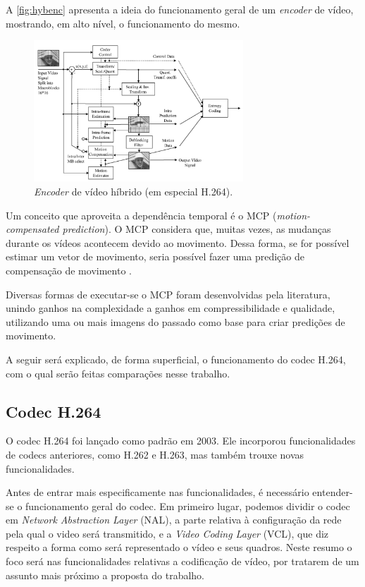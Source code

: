 \documentclass[cic,tc]{iiufrgs}
\begin{document}
A \autoref{fig:hybenc} apresenta a ideia do funcionamento geral de um \textit{encoder} de vídeo,
mostrando, em alto nível, o funcionamento do mesmo.
\begin{figure}[H]
    \label{fig:hybenc}
    \caption{\textit{Encoder} de vídeo híbrido (em especial H.264).}
    \begin{center}
        \includegraphics[width=0.7\textwidth]{img/HybridCodec.png}
    \end{center}
\end{figure}

Um conceito que aproveita a dependência temporal é o MCP (\textit{motion-compensated prediction}).
O MCP considera que, muitas vezes, as mudanças durante os vídeos acontecem devido ao movimento.
Dessa forma, se for possível estimar um vetor de movimento, seria possível fazer uma predição
de compensação de movimento \cite{SullivanH264}. 

Diversas formas de executar-se o MCP foram desenvolvidas pela literatura, unindo ganhos
na complexidade a ganhos em compressibilidade e qualidade, utilizando uma ou mais imagens 
do passado como base para criar predições de movimento.

A seguir será explicado, de forma superficial, o funcionamento do codec H.264, com o qual 
serão feitas comparações nesse trabalho.

\subsection*{Codec H.264}
O codec H.264 foi lançado como padrão em 2003.
Ele incorporou funcionalidades de codecs anteriores, como H.262 e H.263, mas também
trouxe novas funcionalidades.

Antes de entrar mais especificamente nas funcionalidades, é necessário entender-se o 
funcionamento geral do codec.
Em primeiro lugar, podemos dividir o codec em \emph{Network Abstraction Layer} (NAL), a parte
relativa à configuração da rede pela qual o video será transmitido,
e a \emph{Video Coding Layer} (VCL), que diz respeito a forma como será representado o vídeo 
e seus quadros.
Neste resumo o foco será nas funcionalidades relativas a codificação de vídeo, 
por tratarem de um assunto mais próximo a proposta do trabalho.
\end{document}
